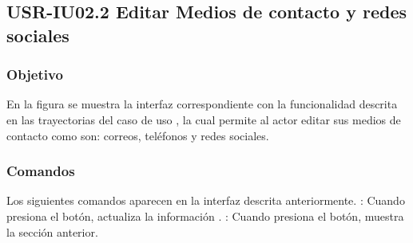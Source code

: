 \clearpage
\subsection{USR-IU02.2 Editar Medios de contacto y redes sociales}

\subsubsection{Objetivo}
En la figura  se muestra la interfaz correspondiente con la funcionalidad descrita en las
trayectorias del caso de uso  , la cual permite al actor editar sus medios de contacto como son: correos, teléfonos y redes sociales.

\subsubsection{Comandos}
Los siguientes comandos aparecen en la interfaz descrita anteriormente.
\Titem {} : Cuando presiona el botón, actualiza la información .
\Titem {} : Cuando presiona el botón, muestra la sección anterior.%



\clearpage

